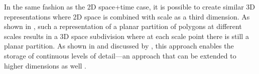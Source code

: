 In the same fashion as the 2D space+time case, it is possible to create similar 3D representations where 2D space is combined with scale as a third dimension.
As shown in , such a representation of a planar partition of polygons at different scales results in a 3D space subdivision where at each scale point there is still a planar partition.
As shown in  and discussed by \citet{Meijers11}, this approach enables the storage of continuous levels of detail---an approach that can be extended to higher dimensions as well \citep{Stoter12,Stoter12a}.
